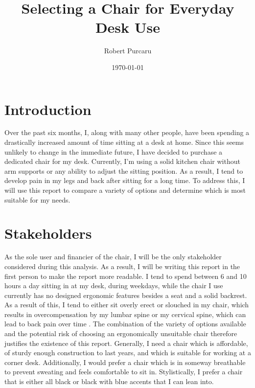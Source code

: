 \documentclass[11pt]{article}
\begin{document}
    \title{Selecting a Chair for Everyday Desk Use}
    \author{Robert Purcaru}
    \date{\today}
    \maketitle

    \section{Introduction}
    Over the past six months, I, along with many other people, have been spending a drastically increased amount of time sitting at a desk at home.  Since this seems unlikely to change in the immediate future, I have decided to purchase a dedicated chair for my desk. Currently, I'm using a solid kitchen chair without arm supports or any ability to adjust the sitting position. As a result, I tend to develop pain in my legs and back after sitting for a long time. To address this, I will use this report to compare a variety of options and determine which is most suitable for my needs.

    \section{Stakeholders}
    As the sole user and financier of the chair, I will be the only stakeholder considered during this analysis. As a result, I will be writing this report in the first person to make the report more readable. I tend to spend between 6 and 10 hours a day sitting in at my desk, during weekdays, while the chair I use currently has no designed ergonomic features besides a seat and a solid backrest. As a result of this, I tend to either sit overly erect or slouched in my chair, which results in overcompensation by my lumbar spine or my cervical spine, which can lead to back pain over time \cite{black1996influence}. The combination of the variety of options available and the potential risk of choosing an ergonomically unsuitable chair therefore justifies the existence of this report. Generally, I need a chair which is affordable, of sturdy enough construction to last years, and which is suitable for working at a corner desk. Additionally, I would prefer a chair which is in someway breathable to prevent sweating and feels comfortable to sit in. Stylistically, I prefer a chair that is either all black or black with blue accents that I can lean into.
\end{document}
